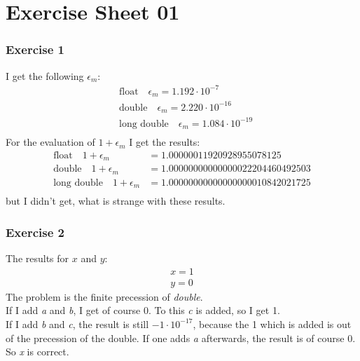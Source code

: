 \documentclass{scrartcl}
\begin{document}
	
	\part*{Exercise Sheet 01}
	
	\section*{Exercise 1}
	I get the following $\epsilon_m$:
	\begin{align*}
		&\text{float}\quad\epsilon_m = 1.192 \cdot 10^{-7}\\
		&\text{double}\quad\epsilon_m = 2.220 \cdot 10^{-16}\\		
		&\text{long double}\quad\epsilon_m = 1.084 \cdot 10^{-19}\\	
	\end{align*}
	For the evaluation of $1 + \epsilon_m$ I get the results:
	\begin{align*}
		\text{float}\quad 1 + \epsilon_m &= 1.00000011920928955078125\\
		\text{double}\quad 1 + \epsilon_m &= 1.00000000000000022204460492503\\		
		\text{long double}\quad 1 + \epsilon_m &= 1.00000000000000000010842021725\\
	\end{align*}
	but I didn't get, what is strange with these results.
	
	\section*{Exercise 2}
	The results for $x$ and $y$:
	\begin{align*}
		x = 1\\
		y = 0
	\end{align*}
	The problem is the finite precession of \emph{double}.\\
	If I add \emph{a} and \emph{b}, I get of course 0. To this \emph{c} is added, so I get 1.\\
	If I add \emph{b} and \emph{c}, the result is still $-1 \cdot 10^{-17}$, because the 1 which is added is out of the precession of the double. If one adds \emph{a} afterwards, the result is of course 0.\\
	So \emph{x} is correct.
	
\end{document}
